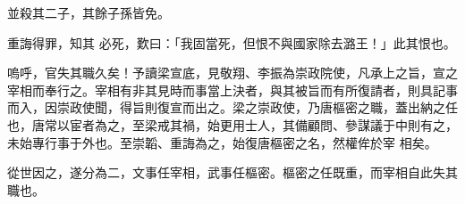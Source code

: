\begin{pinyinscope}
 並殺其二子，其餘子孫皆免。



 重誨得罪，知其
 必死，歎曰：「我固當死，但恨不與國家除去潞王！」此其恨也。



 嗚呼，官失其職久矣！予讀梁宣底，見敬翔、李振為崇政院使，凡承上之旨，宣之宰相而奉行之。宰相有非其見時而事當上決者，與其被旨而有所復請者，則具記事而入，因崇政使聞，得旨則復宣而出之。梁之崇政使，乃唐樞密之職，蓋出納之任也，唐常以宦者為之，至梁戒其禍，始更用士人，其備顧問、參謀議于中則有之，未始專行事于外也。至崇韜、重誨為之，始復唐樞密之名，然權侔於宰
 相矣。



 從世因之，遂分為二，文事任宰相，武事任樞密。樞密之任既重，而宰相自此失其職也。



\end{pinyinscope}